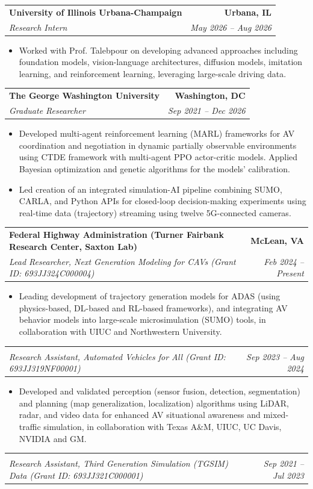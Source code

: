 \documentclass[letterpaper,11pt]{article}
\makeatletter
\newcommand{\resumeItem}[1]{
  \item\small{
    {#1 \vspace{+3pt}}
  }
}
\newcommand{\resumeSubheading}[4]{
  \vspace{-2pt}\item
    \begin{tabular*}{1.0\textwidth}[t]{l@{\extracolsep{\fill}}r}
      \textbf{#1} & \textbf{\small #2} \\[2pt]   %
      \textit{\small#3} & \textit{\small #4} \\
    \end{tabular*}\vspace{-7pt}
}
\newcommand{\resumeItemListStart}{\begin{itemize}}
\newcommand{\resumeItemListEnd}{\end{itemize}\vspace{-4pt}}
\makeatother
\begin{document}
    \resumeSubheading
      {University of Illinois Urbana-Champaign}{Urbana, IL} 
      {Research Intern}{May 2026 -- Aug 2026}
      
    \resumeItemListStart
        \resumeItem {Worked with Prof. Talebpour on developing advanced approaches including foundation models, vision-language architectures, diffusion models, imitation learning, and reinforcement learning, leveraging large-scale driving data.}
    \resumeItemListEnd

    \resumeSubheading
      {The George Washington University}{Washington, DC} 
      {Graduate Researcher}{Sep 2021 -- Dec 2026}
      
    \resumeItemListStart
        \resumeItem {Developed multi-agent reinforcement learning (MARL) frameworks for AV coordination and negotiation in dynamic partially observable environments using CTDE framework with multi-agent PPO actor-critic models. Applied Bayesian optimization and genetic algorithms for the models' calibration.}
        \resumeItem {Led creation of an integrated simulation-AI pipeline combining SUMO, CARLA, and Python APIs for closed-loop decision-making experiments using real-time data (trajectory) streaming using twelve 5G-connected cameras.}
    \resumeItemListEnd

    \resumeSubheading
      {Federal Highway Administration \footnotesize(Turner Fairbank Research Center, Saxton Lab)}{McLean, VA}
      {Lead Researcher, Next Generation Modeling for CAVs {\footnotesize(Grant ID: 693JJ324C000004)}}{Feb 2024 -- Present}
      
    \resumeItemListStart
        \resumeItem {Leading development of trajectory generation models for ADAS (using physics-based, DL-based and RL-based frameworks), and integrating AV behavior models into large-scale microsimulation (SUMO) tools, in collaboration with UIUC and Northwestern University.}
        
    \resumeItemListEnd
    \vspace{-23pt}
    \resumeSubheading
      {}{}
      {Research Assistant, Automated Vehicles for All {\footnotesize(Grant ID: 693JJ319NF00001)}}{Sep 2023 -- Aug 2024}
      
    \resumeItemListStart
        \resumeItem {Developed and validated perception (sensor fusion, detection, segmentation) and planning (map generalization, localization) algorithms using LiDAR, radar, and video data for enhanced AV situational awareness and mixed-traffic simulation, in collaboration with Texas A\&M, UIUC, UC Davis, NVIDIA and GM.}
    \resumeItemListEnd
    \vspace{-23pt}
    \resumeSubheading
      {}{}
      {Research Assistant, Third Generation Simulation (TGSIM) Data {\footnotesize (Grant ID: 693JJ321C000001)}}{Sep 2021 -- Jul 2023}
      
\end{document}
